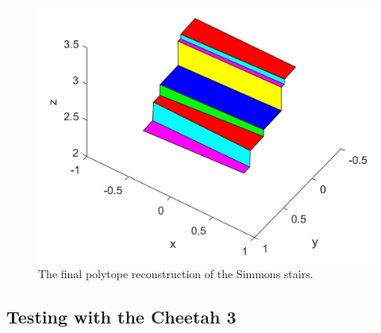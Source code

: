 
\begin{figure}[!h]
\centering
\includegraphics[width=\columnwidth]{Sections/Figures/simmons-stairs-diagonal-geom.jpg}
\caption{The final polytope reconstruction of the Simmons stairs. }
\label{simmons-polytope}
\end{figure}

\subsection{Testing with the Cheetah 3}

